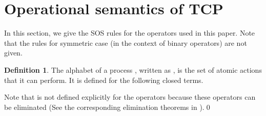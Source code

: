 \documentclass[copyright]{eptcs}
\theoremstyle{plain}
\theoremstyle{definition}
\newtheorem{definition}[theorem]{Definition}
\begin{document}
\section{Operational semantics of TCP}\label{osrules}

In this section, we give the SOS rules for the operators used in this paper. Note that the rules for symmetric case (in the context of binary operators) are not given.



\begin{definition}
The alphabet of a process , written as , is the set of atomic actions that it can perform. It is defined for the following closed terms.

Note that  is not defined explicitly for the operators  because these operators can be eliminated (See the corresponding elimination theorems in \citep{acpbook}).\qed
\end{definition}
\end{document}
